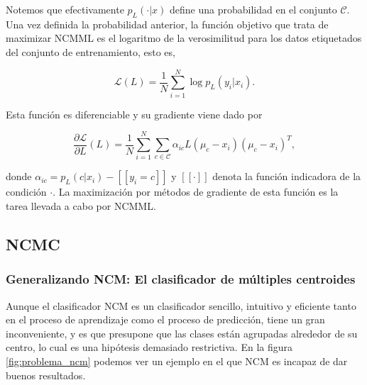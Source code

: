 \documentclass{book}
\begin{document}
Notemos que efectivamente $p_L(\cdot|x)$ define una probabilidad en el conjunto $\mathcal{C}$. Una vez definida la probabilidad anterior, la función objetivo que trata de maximizar NCMML es el logaritmo de la verosimilitud para los datos etiquetados del conjunto de entrenamiento, esto es,

\begin{equation}
\mathcal{L}(L) = \frac{1}{N}\sum_{i=1}^N\log p_L(y_i|x_i).
\end{equation} 

Esta función es diferenciable y su gradiente viene dado por

\begin{equation}
\frac{\partial \mathcal{L}}{\partial L}(L) = \frac{1}{N} \sum_{i=1}^N \sum\limits_{c\in \mathcal{C}} \alpha_{ic} L (\mu_c - x_i)(\mu_c - x_i)^T,
\end{equation}

donde $\alpha_{ic} = p_L(c|x_i) - [\![ y_i = c ]\!]$ y $[\![ \cdot ]\!]$ denota la función indicadora de la condición $\cdot$. La maximización por métodos de gradiente de esta función es la tarea llevada a cabo por NCMML.



\subsection{NCMC} \label{section:ncmc}

\subsubsection{Generalizando NCM: El clasificador de múltiples centroides}

Aunque el clasificador NCM es un clasificador sencillo, intuitivo y eficiente tanto en el proceso de aprendizaje como el proceso de predicción, tiene un gran inconveniente, y es que presupone que las clases están agrupadas alrededor de su centro, lo cual es una hipótesis demasiado restrictiva. En la figura \ref{fig:problema_ncm} podemos ver un ejemplo en el que NCM es incapaz de dar buenos resultados.
\end{document}
